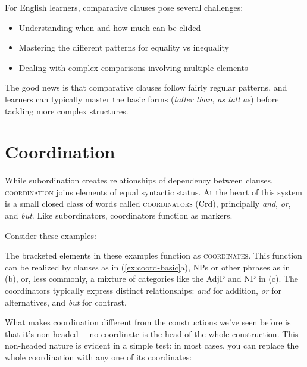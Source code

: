For English learners, comparative clauses pose several challenges:
\begin{itemize}[noitemsep]
    \item Understanding when and how much can be elided
    \item Mastering the different patterns for equality vs inequality
    \item Dealing with complex comparisons involving multiple elements
\end{itemize}

The good news is that comparative clauses follow fairly regular patterns, and learners can typically master the basic forms (\textit{taller than}, \textit{as tall as}) before tackling more complex structures.


\section{Coordination}\label{sec:coordination}

While subordination creates relationships of dependency between clauses, \textsc{coordination} joins elements of equal syntactic status. At the heart of this system is a small closed class of words called \textsc{coordinators} (Crd), principally \textit{and}, \textit{or}, and \textit{but}. Like subordinators, coordinators function as markers.

Consider these examples:

\ea \label{ex:coord-basic}
    \z
\z

The bracketed elements in these examples function as \textsc{coordinates}. This function can be realized by clauses as in (\ref{ex:coord-basic}a), NPs or other phrases as in (b), or, less commonly, a mixture of categories like the AdjP and NP in (c). The coordinators typically express distinct relationships: \textit{and} for addition, \textit{or} for alternatives, and \textit{but} for contrast.

What makes coordination different from the constructions we've seen before is that it's non-headed~-- no coordinate is the head of the whole construction. This non-headed nature is evident in a simple test: in most cases, you can replace the whole coordination with any one of its coordinates:

